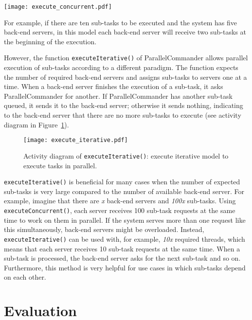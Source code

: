 \documentclass[10pt,conference,letterpaper]{IEEEtran}
\begin{document}
\begin{figure*}
  \centering
  \texttt{[image: execute\_concurrent.pdf]}
  \caption{The sequence Diagram of ParallelCommander.executeConcurrent(): execute tasks in parallel concurrently and collect the results in one stream.}
  \label{fig:execute_concurrent}
\end{figure*}

For example, if there are ten sub-tasks to be executed and the system
has five back-end servers, in this model each back-end server will
receive two sub-tasks at the beginning of the execution.

However, the function \texttt{executeIterative()} of ParallelCommander
allows parallel execution of sub-tasks according to a different
paradigm.  The function expects the number of required back-end
servers and assigns sub-tasks to servers one at a time. When a
back-end server finishes the execution of a sub-task, it asks
ParallelCommander for another. If ParallelCommander has another
sub-task queued, it sends it to the back-end server; otherwise it
sends nothing, indicating to the back-end server that there are no
more sub-tasks to execute (see activity diagram in Figure~\ref{fig:execute_iterative}).

\begin{figure}
  \centering
    \texttt{[image: execute\_iterative.pdf]}
  \caption{Activity diagram of \texttt{executeIterative()}: execute iterative model to execute tasks in parallel.}
  \label{fig:execute_iterative}
\end{figure}

\texttt{executeIterative()} is beneficial for many cases when the
number of expected sub-tasks is very large compared to the number of
available back-end server. For example, imagine that there are
\emph{x} back-end servers and \emph{100x} sub-tasks.  Using
\texttt{executeConcurrent()}, each server receives 100 sub-task requests at the
same time to work on them in parallel. If the system serves more than
one request like this simultaneously, back-end servers might be
overloaded. Instead, \texttt{executeIterative()} can be used with, for
example, \emph{10x} required threads, which means that each server
receives 10 sub-task requests at the same time. When a sub-task is
processed, the back-end server asks for the next sub-task and so
on. Furthermore, this method is very helpful for use cases in which
sub-tasks depend on each other.

\section{Evaluation}\label{lab:eval}
\end{document}
